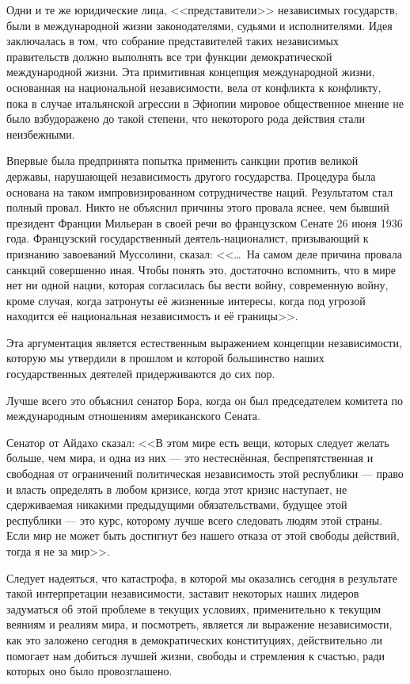 Одни и те же юридические лица, <<представители>> независимых государств, были в международной жизни законодателями, судьями и исполнителями. Идея заключалась в том, что собрание представителей таких независимых правительств должно выполнять все три функции демократической международной жизни. Эта примитивная концепция международной жизни, основанная на национальной независимости, вела от конфликта к конфликту, пока в случае итальянской агрессии в Эфиопии мировое общественное мнение не было взбудоражено до такой степени, что некоторого рода действия стали неизбежными.

Впервые была предпринята попытка применить санкции против великой державы, нарушающей независимость другого государства. Процедура была основана на таком импровизированном сотрудничестве наций. Результатом стал полный провал. Никто не объяснил причины этого провала яснее, чем бывший президент Франции Мильеран в своей речи во французском Сенате 26 июня 1936 года. Французский государственный деятель-националист, призывающий к признанию завоеваний Муссолини, сказал: <<\ldots\ На самом деле причина провала санкций совершенно иная. Чтобы понять это, достаточно вспомнить, что в мире нет ни одной нации, которая согласилась бы вести войну, современную войну, кроме случая, когда затронуты её жизненные интересы, когда под угрозой находится её национальная независимость и её границы>>.

Эта аргументация является естественным выражением концепции независимости, которую мы утвердили в прошлом и которой большинство наших государственных деятелей придерживаются до сих пор.

Лучше всего это объяснил сенатор Бора, когда он был председателем комитета по международным отношениям американского Сената.

Сенатор от Айдахо сказал: <<В этом мире есть вещи, которых следует желать больше, чем мира, и одна из них — это нестеснённая, беспрепятственная и свободная от ограничений политическая независимость этой республики — право и власть определять в любом кризисе, когда этот кризис наступает, не сдерживаемая никакими предыдущими обязательствами, будущее этой республики — это курс, которому лучше всего следовать людям этой страны. Если мир не может быть достигнут без нашего отказа от этой свободы действий, тогда я не за мир>>.

Следует надеяться, что катастрофа, в которой мы оказались сегодня в результате такой интерпретации независимости, заставит некоторых наших лидеров задуматься об этой проблеме в текущих условиях, применительно к текущим веяниям и реалиям мира, и посмотреть, является ли выражение независимости, как это заложено сегодня в демократических конституциях, действительно ли помогает нам добиться лучшей жизни, свободы и стремления к счастью, ради которых оно было провозглашено.

